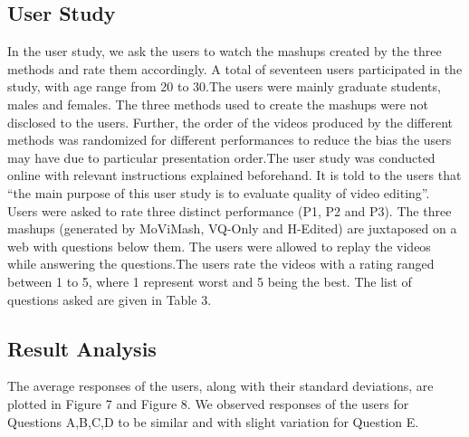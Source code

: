 \documentclass{sig-alternate}
\begin{document}
\subsection{User Study}
In the user study, we ask the users to watch the mashups created by the three methods and rate them accordingly. A total of seventeen users participated in the study, with age range from 20 to 30.The users were mainly graduate students, males and females. The three methods used to create the mashups were not disclosed to the users. Further, the order of the videos produced by the different methods was randomized for different performances to reduce the bias the users may have due to particular presentation order.The user study was conducted online with relevant instructions explained beforehand. It is told to the users that “the main purpose of this user study is to evaluate quality of video editing”. Users were asked to rate three distinct performance (P1, P2 and P3). The three mashups (generated by MoViMash, VQ-Only and H-Edited)
are juxtaposed on a web with questions below them. The users were allowed to replay the videos while answering the questions.The users rate the videos with a rating ranged between 1 to 5, where 1 represent worst and 5 being the best. The list of questions asked are given in Table 3.\\
\subsection{Result Analysis}
The average responses of the users, along with their standard deviations, are plotted in Figure 7 and Figure 8. We observed responses of the users for Questions A,B,C,D to be similar and with
slight variation for Question E.
\end{document}
